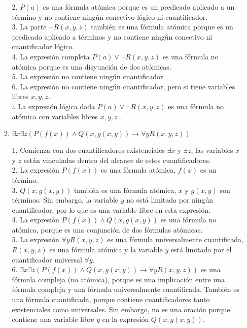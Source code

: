 \documentclass[a4paper,10pt]{article}
\begin{document}
\begin{enumerate}
\begin{enumerate}
2. \(P(a)\) es una fórmula atómica porque es un predicado aplicado a un término y no contiene ningún conectivo lógico ni cuantificador.\\

3. La parte \(\neg R(x, y, z)\) también es una fórmula atómica porque es un predicado aplicado a términos y no contiene ningún conectivo ni cuantificador lógico.\\

4. La expresión completa \(P(a) \lor \neg R(x, y, z)\) es una fórmula no atómica porque es una disyunción de dos atómicas.\\

5. La expresión no contiene ningún cuantificador.\\

6. La expresión no contiene ningún cuantificador, pero si tiene variables libres \(x, y, z\).\\

$\therefore$ La expresión lógica dada \(P(a) \lor \neg R(x, y, z)\) es una fórmula no atómica con variables libres \(x, y, z\) .\\
  
  \item $\exists x \exists z(P(f(x)) \wedge Q(x,g(x, y)) \to \forall y R(x,y,z)) $

1. Comienza con dos cuantificadores existenciales \(\exists x\) y \(\exists z\), las variables \(x\) y \(z\) están vinculadas dentro del alcance de estos cuantificadores.\\

2. La expresión \(P(f(x))\) es una fórmula atómica, \(f(x)\) es un término.\\

3. \(Q(x,g(x, y))\) también es una fórmula atómica, \(x\) y \(g(x, y)\) son términos. Sin embargo, la variable \(y\) no está limitada por ningún cuantificador, por lo que es una variable libre en esta expresión.\\

4. La expresión \(P(f(x)) \wedge Q(x,g(x, y))\) es una fórmula no atómica, porque es una conjunción de dos fórmulas atómicas.\\

5. La expresión \(\forall y R(x,y,z)\) es una fórmula universalmente cuantificada, \(R(x,y,z)\) es una fórmula atómica y la variable \(y\) está limitado por el cuantificador universal \(\forall y\).\\

6. \(\exists x \exists z(P(f(x)) \wedge Q(x,g(x, y)) \to \forall y R(x,y,z))\) es una fórmula compleja (no atómica), porque es una implicación entre una fórmula compleja y una fórmula universalmente cuantificada. También es una fórmula cuantificada, porque contiene cuantificadores tanto existenciales como universales. Sin embargo, no es una oración porque contiene una variable libre \(y\) en la expresión \(Q(x,g(x, y))\).\\


\end{enumerate}
\end{enumerate}
\end{document}
